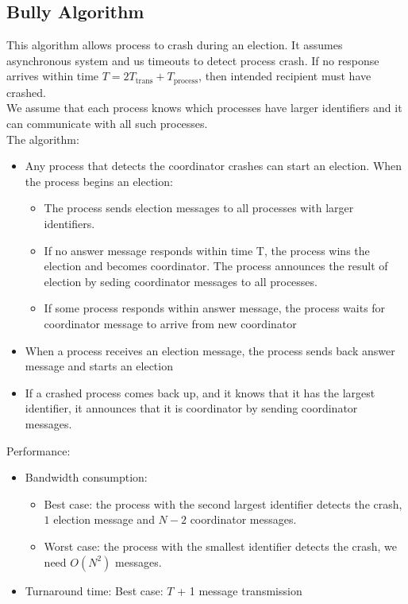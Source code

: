 \begin{multicols*}{2}
\subsection{Bully Algorithm}

\noindent This algorithm allows process to crash during an election. It assumes asynchronous system and us timeouts to detect process crash. If no response arrives within time $T=2T_{\text{trans}} + T_{\text{process}}$, then intended recipient must have crashed.\\

\noindent We assume that each process knows which processes have larger identifiers and it can communicate with all such processes.\\

\noindent The algorithm:

\begin{itemize}
  \item Any process that detects the coordinator crashes can start an election. When the process begins an election:
  \begin{itemize}
    \item The process sends election messages to all processes with larger identifiers.
    \item If no answer message responds within time T, the process wins the election and becomes coordinator. The process announces the result of election by seding coordinator messages to all processes.
    \item If some process responds within answer message, the process waits for coordinator message to arrive from new coordinator
  \end{itemize}
  \item When a process receives an election message, the process sends back answer message and starts an election
  \item If a crashed process comes back up, and it knows that it has the largest identifier, it announces that it is coordinator by sending coordinator messages.
\end{itemize}

\noindent Performance:
\begin{itemize}
  \item Bandwidth consumption: 
  \begin{itemize}
    \item Best case: the process with the second largest identifier detects the crash, $1$ election message and $N-2$ coordinator messages.
    \item Worst case: the process with the smallest identifier detects the crash, we need $O(N^2)$ messages.
  \end{itemize}
  \item Turnaround time: Best case: $T$ + 1 message transmission
\end{itemize}


\end{multicols*}
